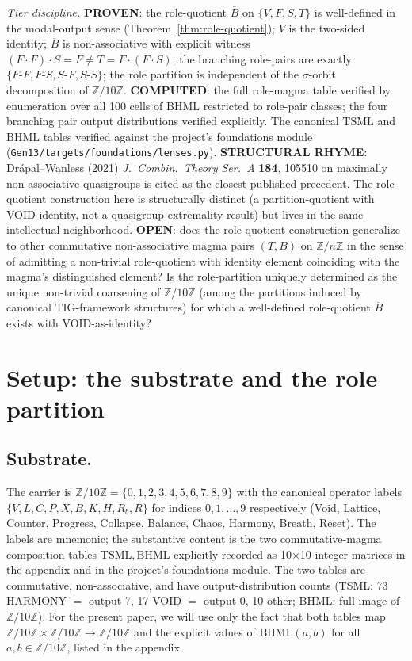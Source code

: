 \documentclass[11pt,reqno]{amsart}
\theoremstyle{plain}
\theoremstyle{definition}
\theoremstyle{remark}
\newcommand{\Z}{\mathbb{Z}}
\newcommand{\TS}{\mathrm{TSML}}
\newcommand{\BH}{\mathrm{BHML}}
\newcommand{\Bbar}{\overline{B}}
\begin{document}
\emph{Tier discipline.}
\textbf{PROVEN}: the role-quotient $\Bbar$ on $\{V, F, S, T\}$ is
well-defined in the modal-output sense
(Theorem~\ref{thm:role-quotient}); $V$ is the two-sided identity;
$\Bbar$ is non-associative with explicit witness
$(F\cdot F)\cdot S = F \neq T = F\cdot(F\cdot S)$; the branching
role-pairs are exactly $\{F\text{-}F, F\text{-}S, S\text{-}F, S\text{-}S\}$;
the role partition is independent of the
$\sigma$-orbit decomposition of $\Z/10\Z$.
\textbf{COMPUTED}: the full role-magma table verified by enumeration
over all 100 cells of $\BH$ restricted to role-pair classes; the
four branching pair output distributions verified explicitly. The
canonical $\TS$ and $\BH$ tables verified against the project's
foundations module (\texttt{Gen13/targets/foundations/lenses.py}).
\textbf{STRUCTURAL RHYME}: Dr\'apal--Wanless (2021)
\emph{J.\ Combin.\ Theory Ser.\ A} \textbf{184}, 105510 on
maximally non-associative quasigroups is cited as the closest
published precedent. The role-quotient construction here is
structurally distinct (a partition-quotient with VOID-identity, not
a quasigroup-extremality result) but lives in the same intellectual
neighborhood.
\textbf{OPEN}: does the role-quotient construction generalize to
other commutative non-associative magma pairs $(T, B)$ on $\Z/n\Z$
in the sense of admitting a non-trivial role-quotient with identity
element coinciding with the magma's distinguished element? Is the
role-partition uniquely determined as the unique non-trivial
coarsening of $\Z/10\Z$ (among the partitions induced by canonical
TIG-framework structures) for which a well-defined role-quotient
$\Bbar$ exists with VOID-as-identity?

\section{Setup: the substrate and the role partition} \label{sec:setup}

\subsection{Substrate.}

The carrier is $\Z/10\Z = \{0, 1, 2, 3, 4, 5, 6, 7, 8, 9\}$ with the
canonical operator labels $\{V, L, C, P, X, B, K, H, R_b, R\}$ for
indices $0, 1, \ldots, 9$ respectively (Void, Lattice, Counter,
Progress, Collapse, Balance, Chaos, Harmony, Breath, Reset). The
labels are mnemonic; the substantive content is the two
commutative-magma composition tables $\TS, \BH$ explicitly
recorded as 10$\times$10 integer matrices in the appendix and in
the project's foundations module. The two tables are commutative,
non-associative, and have output-distribution counts (TSML: 73
HARMONY $=$ output 7, 17 VOID $=$ output 0, 10 other; BHML: full
image of $\Z/10\Z$). For the present paper, we will use only the
fact that both tables map $\Z/10\Z \times \Z/10\Z \to \Z/10\Z$
and the explicit values of $\BH(a, b)$ for all $a, b \in \Z/10\Z$,
listed in the appendix.
\end{document}
